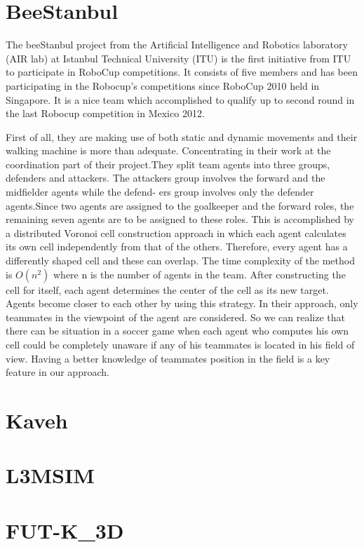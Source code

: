 \section{BeeStanbul}
\cite{BeeStanbulTDP} The beeStanbul project from the Artificial Intelligence and Robotics laboratory
(AIR lab) at Istanbul Technical University (ITU) is the first initiative from ITU
to participate in RoboCup competitions. It consists of five members and has been participating in the Robocup's competitions since RoboCup 2010 held in Singapore. It is a nice team which accomplished to qualify up to second round in the last Robocup competition in Mexico 2012.

First of all, they are making use of both static and dynamic movements and their walking machine is more than adequate. Concentrating in their work at the coordination part of their project.They split team agents into three groups, defenders and attackers. The attackers group involves the forward and the midfielder agents while the defend-
ers group involves only the defender agents.Since two agents are assigned to the
goalkeeper and the forward roles, the remaining seven agents are to be assigned
to these roles. This
is accomplished by a distributed Voronoi cell construction approach in which
each agent calculates its own cell independently from that of the others. Therefore, every agent has a differently shaped cell and these can overlap. The time complexity of the method is $O(n^{2})$ where n is the number of agents in the team. After constructing the cell
for itself, each agent determines the center of the cell as its new target. Agents
become closer to each other by using this strategy. In their approach, only teammates in the viewpoint of the agent are considered. So we can realize that there can be situation in a soccer game when each agent who computes his own cell could be completely unaware if any of his teammates is located in his field of view. Having a better knowledge of teammates position in the field is a key feature in our approach.

\section{Kaveh}

\section{L3M\-SIM}

\section{FUT-K\_3D}


